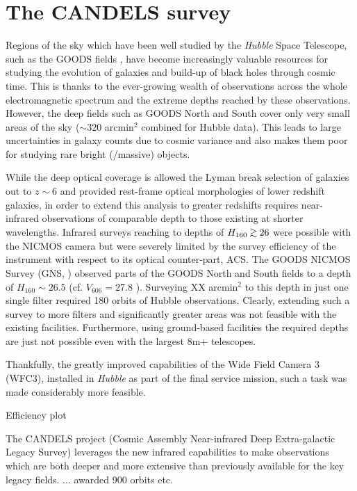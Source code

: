 \section{The CANDELS survey}
Regions of the sky which have been well studied by the \emph{Hubble} Space Telescope, such as the GOODS fields \citep{2004ApJ...600L..93G}, have become increasingly valuable resources for studying the evolution of galaxies and build-up of black holes through cosmic time. This is thanks to the ever-growing wealth of observations across the whole electromagnetic spectrum and the extreme depths reached by these observations.
However, the deep fields such as GOODS North and South cover only very small areas of the sky ($\sim 320$ arcmin$^{2}$ combined for Hubble data). This leads to large uncertainties in galaxy counts due to cosmic variance and also makes them poor for studying rare bright (/massive) objects.

While the deep optical coverage is allowed the Lyman break selection of galaxies out to $z\sim6$ and provided rest-frame optical morphologies of lower redshift galaxies, in order to extend this analysis to greater redshifts requires near-infrared observations of comparable depth to those existing at shorter wavelengths. Infrared surveys reaching to depths of $H_{160} \simgreat 26$ were possible with the NICMOS camera but were severely limited by the survey efficiency of the instrument with respect to its optical counter-part, ACS. The GOODS NICMOS Survey (GNS, ) observed parts of the GOODS North and South fields to a depth of $H_{160} \sim 26.5$ (cf. $V_{606} = 27.8$  \citep{2004ApJ...600L..93G}). Surveying XX arcmin$^{2}$ to this depth in just one single filter required 180 orbits of Hubble observations. Clearly, extending such a survey to more filters and significantly greater areas was not feasible with the existing facilities. Furthermore, using ground-based facilities the required depths are just not possible even with the largest 8m+ telescopes. 

Thankfully, the greatly improved capabilities of the Wide Field Camera 3 (WFC3), installed in \emph{Hubble} as part of the final service mission, such a task was made considerably more feasible. 

Efficiency plot

The CANDELS project (Cosmic Assembly Near-infrared Deep Extra-galactic Legacy Survey) leverages the new infrared capabilities to make observations which are both deeper and more extensive than previously available for the key legacy fields. ... awarded 900 orbits etc.

